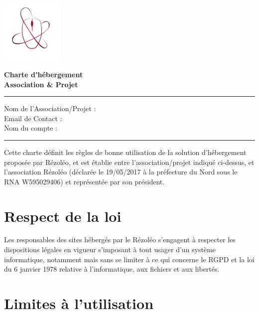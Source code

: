 \documentclass[11pt, a4paper]{article}
\begin{document}
\begin{center}
	\begin{minipage}{0.2\textwidth}
		\includegraphics[height=3cm]{rezoleo_logo.png}
	\end{minipage}
	\begin{minipage}{0.7\textwidth}
		\vspace{0.3cm}
		\Huge \textbf{Charte d'hébergement}\\
		\Huge \textbf{Association \& Projet}
	\end{minipage}
\end{center}

\vspace*{0.5cm}

\hrule
\vspace{.5cm}
\noindent Nom de l'Association/Projet : \dotfill
\vspace{.5cm}\\
Email de Contact : \dotfill
\vspace{.5cm}\\
Nom du compte : \dotfill\\
\hrule
\vspace{1cm}

\noindent Cette charte définit les règles de bonne utilisation de la solution d'hébergement proposée par Rézoléo, et est établie entre l'association/projet indiqué ci-dessus, et l'association Rézoléo (déclarée le 19/05/2017 à la préfecture du Nord sous le RNA W595029406) et représentée par son président.

\section{Respect de la loi}

Les responsables des sites hébergés par le Rézoléo s'engagent à respecter les dispositions légales en vigueur s'imposant à tout usager d'un système informatique, notamment mais sans se limiter à ce qui concerne le RGPD et la loi du 6 janvier 1978 relative à l'informatique, aux fichiers et aux libertés.

\section{Limites à l'utilisation}
\end{document}
